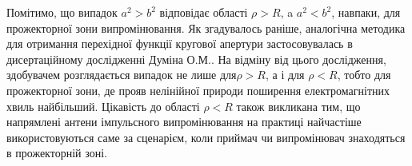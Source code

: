 Помітимо, що випадок $ a^2 > b^2 $ відповідає області $ \rho > R $, a 
$ a^2 < b^2 $, навпаки, для прожекторної зони випромінювання. Як 
згадувалось раніше, аналогічна методика для отримання перехідної функції 
кругової апертури застосовувалась в дисертаційному дослідженні Думіна О.М.. 
На відміну від цього дослідження, здобувачем розглядається випадок не лише 
для$ \rho > R $, а і для $ \rho < R $, тобто для прожекторної зони, де 
прояв нелінійної природи поширення електромагнітних хвиль найбільший. 
Цікавість до області $ \rho < R $ також викликана тим, що напрямлені 
антени імпульсного випромінювання на практиці найчастіше використовуються 
саме за сценарієм, коли приймач чи випромінювач знаходяться в прожекторній 
зоні.
%
%
%
%

